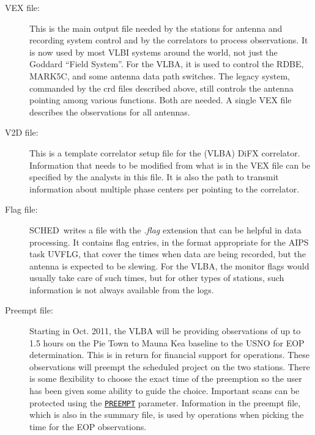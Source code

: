 \documentclass{report}
\newcommand{\schedb}{{\sc SCHED~}}
\begin{document}
\begin{description}

\item[VEX file:] This is the main output file needed by the stations
for antenna and recording system control and by the correlators to
process observations.  It is now used by most VLBI systems around the
world, not just the Goddard ``Field System''.  For the VLBA, it is
used to control the RDBE, MARK5C, and some antenna data path switches.
The legacy system, commanded by the crd files described above, still
controls the antenna pointing among various functions.  Both are
needed.  A single VEX file describes the observations for all
antennas.

\item[V2D file:] This is a template correlator setup file for the
(VLBA) DiFX correlator.  Information that needs to be modified from what
is in the VEX file can be specified by the analysts in this file.
It is also the path to transmit information about multiple phase
centers per pointing to the correlator.

\item[Flag file:] \schedb writes a file with the {\sl .flag} extension
that can be helpful in data processing.  It contains flag entries, in
the format appropriate for the AIPS task UVFLG, that cover the times
when data are being recorded, but the antenna is expected to be
slewing.  For the VLBA, the monitor flags would usually take care of
such times, but for other types of stations, such information is not
always available from the logs.

\item[Preempt file:] Starting in Oct. 2011, the VLBA will be providing
observations of up to 1.5 hours on the Pie Town to Mauna Kea baseline
to the USNO for EOP determination.  This is in return for financial
support for operations.  These observations will preempt the scheduled
project on the two stations.  There is some flexibility to choose the
exact time of the preemption so the user has been given some ability
to guide the choice.  Important scans can be protected using the
{\hyperref[MP:PREEMPT]{{\tt PREEMPT}}} parameter.  Information in the
preempt file, which is also in the summary file, is used by operations
when picking the time for the EOP observations.


\end{description}
\end{document}
